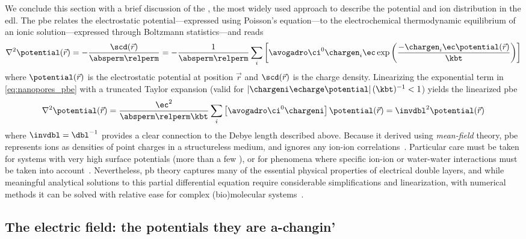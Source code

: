 We conclude this section with a brief discussion of the , the most widely used approach to
describe the potential and ion distribution in the \gls{edl}. The \gls{pbe} relates the electrostatic
potential---expressed using Poisson's equation---to the electrochemical thermodynamic equilibrium of an ionic
solution---expressed through Boltzmann statistics---and reads~\cite{Gouy-1910,Chapman-1913,Baker-2005}
%
\begin{equation}\label{eq:nanopores_pbe}
  \nabla^2 \potential(\vec{r}) = - \dfrac{\scd(\vec{r})}{\absperm \relperm}
  = - \dfrac{1}{\absperm \relperm}
  \sum_i \left[ \avogadro \ci^0 \chargen_i \ec
         \exp \left( \dfrac{-\chargen_i \ec \potential(\vec{r}) }{\kbt} \right)
        \right]
\end{equation}
%
where $\potential(\vec{r})$ is the electrostatic potential at position $\vec{r}$ and $\scd(\vec{r})$ is the
charge density. Linearizing the exponential term in \cref{eq:nanopores_pbe} with a truncated Taylor expansion
(valid for $\left| \chargeni \echarge \potential \right| (\kbt)^{-1} < 1$) yields the linearized \gls{pbe}
%
\begin{equation}\label{eq:nanopores_pbe_linear}
  \nabla^2 \potential(\vec{r})
  = \dfrac{\ec^2}{\absperm \relperm \kbt} \sum_i \left[ \avogadro \ci^0 \chargeni \right]
      \potential(\vec{r})
  = \invdbl^2 \potential(\vec{r})
\end{equation}
%
where $\invdbl = \dbl^{-1}$ provides a clear connection to the Debye length described above. Because it
derived using \emph{mean-field} theory, \gls{pbe} represents ions as densities of point charges in a
structureless medium, and ignores any ion-ion correlations~\cite{Bocquet-2010}. Particular care must be taken
for systems with very high surface potentials (more than a few \si{\kTe}), or for phenomena where specific
ion-ion or water-water interactions must be taken into account~\cite{Collins-2012}. Nevertheless, \gls{pb}
theory captures many of the essential physical properties of electrical double layers, and while meaningful
analytical solutions to this partial differential equation require considerable simplifications and
linearization, with numerical methods it can be solved with relative ease for complex (bio)molecular
systems~\cite{Baker-2001,Baker-2005}.


\subsection{The electric field: the potentials they are a-changin'}
%
\label{sec:np:potential}
%

